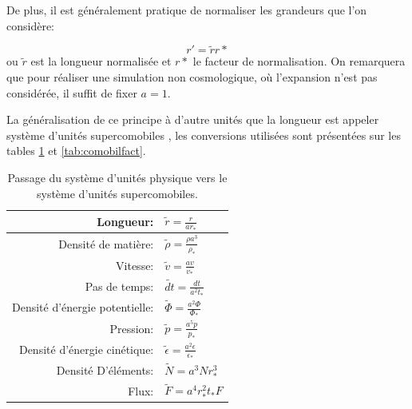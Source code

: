 De plus, il est généralement pratique de normaliser les grandeurs que l'on considère:

\begin{equation}
r'=\tilde{r}r*
\end{equation}
ou $\tilde{r}$ est la longueur normalisée et $r*$ le facteur de normalisation.
On remarquera que pour réaliser une simulation non cosmologique, où l'expansion n'est pas considérée, il suffit de fixer $a=1$.

La généralisation de ce principe à d'autre unités que la longueur est appeler système d'unités supercomobiles \citep{martel_convenient_1998}, les conversions utilisées sont présentées sur les tables \ref{tab:comobil} et \ref{tab:comobilfact}.

\begin{table}
\begin{center}
\begin{tabular}{r l} \hline 
Longueur: & $\tilde{r}=\frac{r}{ar_*}$ \\ \hline 
Densité de matière: & $\tilde{\rho}=\frac{\rho a^3}{\rho_*}$ \\ \hline 
Vitesse: & $ \tilde{v}=\frac{av}{v_*}$ \\ \hline 
Pas de temps: & $\tilde{dt}=\frac{dt}{a^2t_*}$\\ \hline 
Densité d’énergie potentielle: & $\tilde{\Phi}=\frac{a^2 \Phi}{\Phi_*}$\\ \hline 
Pression: & $\tilde{p}=\frac{a^5 p}{p_*}$\\ \hline 
Densité d’énergie cinétique: & $\tilde{\epsilon}=\frac{a^2 \epsilon}{\epsilon_*}$\\ \hline 
Densité D’éléments: & $\tilde{N}=a^3 N r_*^3$\\ \hline 
Flux: & $\tilde{F}=a^4 r_*^2 t_* F$\\ \hline 
\end{tabular} 
\end{center}
\caption[Système d'unité supercomobile]{Passage du système d'unités physique vers le système d'unités supercomobiles.
\label{tab:comobil}
} 
\end{table}

